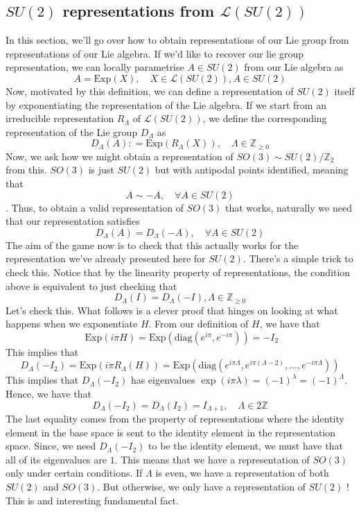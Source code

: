 \subsection{$SU ( 2) $ representations from $\mathcal{ L } ( SU ( 2) ) $}
In this section, we'll go over how 
to obtain representations of our Lie group from representations 
of our Lie algebra. 
If we'd like to recover our lie group 
representation, we can locally parametrise $ A \in SU ( 2) $ 
from our Lie algebra as 
\[
	A = \text{Exp}( X) , \quad X \in \mathcal{ L } ( SU ( 2) ), A \in SU ( 2)  
\] Now, motivated by this definition, we 
can define a representation of $ SU ( 2) $ itself 
by exponentiating the representation of 
the Lie algebra. If we start from an irreducible representation $ R_{ \Lambda }$ 
of $ \mathcal{ L }( SU ( 2) ) $, we define the corresponding 
representation of the Lie group $ D _{ \Lambda  } $ as 
\[
	D _{ \Lambda } ( A) : = \text{Exp} ( R_{ \Lambda } ( X) ) , \quad \Lambda \in \mathbb{ Z}_{ \geq 0}
\] Now, we ask how we 
might obtain a representation of $ SO ( 3)  \sim SU ( 2)  / \mathbb{ Z}_ 2 $ from this. 
$SO ( 3) $ is just $ SU ( 2) $ but 
with antipodal points identified, meaning that 
\[
 A \sim - A, \quad  \forall A \in SU ( 2) 
\] . Thus, to obtain a valid representation of 
$ SO ( 3 ) $ that works, naturally we need that our representation 
satisfies \[
 D_\Lambda ( A )  = D _ \Lambda ( - A ), \quad  \forall A \in SU ( 2) 
\] The aim of the game now is to check that this actually works 
for the representation we've already presented here 
for $ SU ( 2)  $. There's a simple trick to check this. 
Notice that by the linearity property of representations, 
the condition above is equivalent to just checking that 
\[
	D_ \Lambda ( I ) = D _ \Lambda ( - I ), \Lambda \in \mathbb{ Z } _{ \geq 0 } 
\] 
Let's check this. What follows is a clever proof that
hinges on looking at what happens when we exponentiate $ H $. 
From our definition of $H$, we have that 
\[
	\text{ Exp}(i \pi H ) =  \text{Exp}(\text{diag}( e ^{ i \pi } , e ^{  - i \pi  }  ) ) = - I_ 2
\] This implies that 
\[
	D _{ \Lambda } ( - I _ 2) = \text{Exp} ( i \pi R _{ \Lambda } ( H ) )  = \text{Exp} (\text{diag} ( 
	e^{ i \pi \Lambda } , e ^{ i \pi ( \Lambda - 2 ) }, \dots, e ^{ - i \pi \Lambda } ) ) 
\] This implies that $ D _{ \Lambda } ( - I _  2) $  has 
eigenvalues $ \exp( i \pi \lambda )  = ( - 1) ^ \lambda  = ( - 1) ^{ \Lambda}$. 
Hence, we have that 
\[
	D_{ \Lambda } ( - I _ 2 ) = D _ \Lambda ( I _ 2 ) = I _{ \Lambda + 1 }, \quad \Lambda \in 2 \mathbb{ Z} 
\] The last equality comes from the property 
of representations where the identity element in the 
base space is sent to the identity 
element in the representation space. Since, 
we need $ D _ \Lambda ( - I _ 2 ) $ to be the identity 
element, we must have that all of its eigenvalues are 
$ 1 $. 
This means 
that we have a representation of $ SO ( 3 ) $ only 
under certain conditions. If  $ \Lambda $ is even, we have a representation 
of both  $ SU ( 2) $ and $ SO ( 3) $. But otherwise, we only
have a representation of $ SU ( 2) $ ! This is and interesting fundamental fact.

